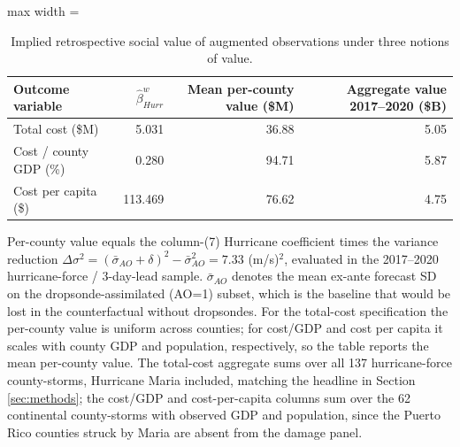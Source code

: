 \begin{table}

\caption{Implied retrospective social value of augmented observations under three notions of value. \label{tab:appA_valuations}}
\centering
\begin{adjustbox}{max width = \textwidth}
\begin{threeparttable}
\begin{tabular}[t]{lrrr}
\toprule
Outcome variable & $\hat{\beta}^w_{Hurr}$ & Mean per-county value (\$M) & Aggregate value 2017--2020 (\$B)\\
\midrule
Total cost (\$M) & 5.031 & 36.88 & 5.05\\
Cost / county GDP (\%) & 0.280 & 94.71 & 5.87\\
Cost per capita (\$) & 113.469 & 76.62 & 4.75\\
\bottomrule
\end{tabular}
\begin{tablenotes}
\small
\item Per-county value equals the column-(7) Hurricane coefficient times the variance reduction $\Delta\sigma^{2}=(\bar{\sigma}_{AO}+\delta)^{2}-\bar{\sigma}_{AO}^{2}=7.33$ (m/s)$^{2}$, evaluated in the 2017--2020 hurricane-force / 3-day-lead sample. $\bar{\sigma}_{AO}$ denotes the mean ex-ante forecast SD on the dropsonde-assimilated (AO=1) subset, which is the baseline that would be lost in the counterfactual without dropsondes. For the total-cost specification the per-county value is uniform across counties; for cost/GDP and cost per capita it scales with county GDP and population, respectively, so the table reports the mean per-county value. The total-cost aggregate sums over all 137 hurricane-force county-storms, Hurricane Maria included, matching the headline in Section \ref{sec:methods}; the cost/GDP and cost-per-capita columns sum over the 62 continental county-storms with observed GDP and population, since the Puerto Rico counties struck by Maria are absent from the damage panel.
\end{tablenotes}
\end{threeparttable}
\end{adjustbox}
\end{table}

